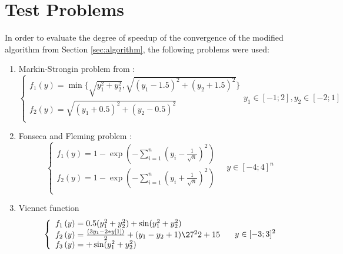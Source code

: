 \documentclass{llncs}
\begin{document}
\section{Test Problems}
\label{sec:test_problems}
In order to evaluate the degree of speedup of the convergence of the modified algorithm from
Section \ref{sec:algorithm}, the following problems were used:
\begin{enumerate}
  \item Markin-Strongin problem from \cite{markinStrongin1993}:
    \begin{equation}
      \left \{
      \begin{array}{l}
        f_1(y) = \min\{\sqrt{y_1^2+y_2^2},\sqrt{(y_1-1.5)^2+(y_2+1.5)^2}\} \\
        f_2(y)=\sqrt{(y_1+0.5)^2+(y_2-0.5)^2} \\
      \end{array}
      \right .
      y_1\in [-1;2],y_2\in [-2;1]
    \end{equation}
  \item Fonseca and Fleming problem \cite{Huband2006}:
  \begin{equation}
    \label{eq:fonseca}
    \left \{
    \begin{array}{l}
      f_{1}\left(y\right) = 1 - \exp \left(-\sum_{i=1}^{n} \left(y_{i} - \frac{1}{\sqrt{n}}
\right)^{2} \right) \\
      f_{2}\left(y\right) = 1 - \exp \left(-\sum_{i=1}^{n} \left(y_{i} + \frac{1}{\sqrt{n}}
\right)^{2} \right) \\
    \end{array}
    \right .
    \quad y\in [-4;4]^n
  \end{equation}
  \item
  Viennet function
  \begin{equation}
    \left \{
    \begin{array}{l}
      f_{1}\left(y\right) = 0.5(y_1^2 + y_2^2) + \sin(y_1^2 + y_2^2)\\
      f_{2}\left(y\right) = \frac{(3y_1 - 2*y[1])}{2} + (y_1-y_2 + 1)\27 ^ 2{2} + 15\\
      f_{3}\left(y\right) =   + \sin(y_1^2 + y_2^2)\\
    \end{array}
    \right .
    \quad y\in [-3;3]^2
  \end{equation}

\end{enumerate}
\end{document}
